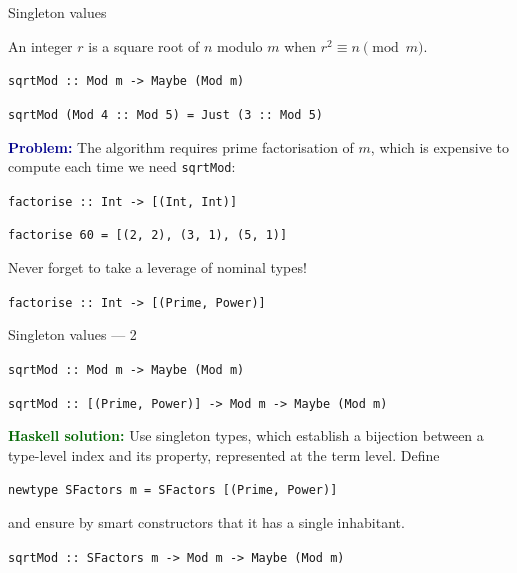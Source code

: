 \documentclass[handout]{beamer}
\def\problem{\textcolor{darkblue}{\bf Problem:} }
\def\solution{\textcolor{darkgreen}{\bf Haskell solution:} }
\begin{document}
\begin{frame}{Singleton values}

\begin{definition}
An integer $r$ is a square root of $n$ modulo $m$ when $r^2 \equiv n \pmod m$.
\end{definition}

{\tt sqrtMod :: Mod m -> Maybe (Mod m) } \par
{\tt sqrtMod (Mod 4 :: Mod 5) = Just (3 :: Mod 5) }

\medskip

\pause

\problem
The algorithm requires prime factorisation of $m$,
which is expensive to compute each time we need {\tt sqrtMod}:

\medskip

{\tt factorise :: Int -> [(Int, Int)] } \par
{\tt factorise 60 = [(2, 2), (3, 1), (5, 1)] } \par

\bigskip

\pause

Never forget to take a leverage of nominal types!

{\tt factorise :: Int -> [(Prime, Power)] } \par

\end{frame}


\begin{frame}{Singleton values --- 2}

{\tt sqrtMod :: Mod m -> Maybe (Mod m) }

\medskip

{\tt sqrtMod :: [(Prime, Power)] -> Mod m -> Maybe (Mod m)}

\medskip

\pause

\solution
Use singleton types, which establish a bijection between a type-level index
and its property, represented at the term level. Define

\medskip

{\tt newtype SFactors m = SFactors [(Prime, Power)] }

\medskip

and ensure by smart constructors that it has a single inhabitant.

\medskip

{\tt sqrtMod :: SFactors m -> Mod m -> Maybe (Mod m)}

\end{frame}
\end{document}

